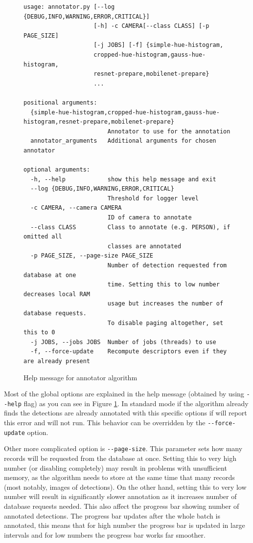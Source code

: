 \begin{figure}
    \begin{verbatim}
usage: annotator.py [--log {DEBUG,INFO,WARNING,ERROR,CRITICAL}]
                    [-h] -c CAMERA[--class CLASS] [-p PAGE_SIZE]
                    [-j JOBS] [-f] {simple-hue-histogram,
                    cropped-hue-histogram,gauss-hue-histogram,
                    resnet-prepare,mobilenet-prepare}
                    ...

positional arguments:
  {simple-hue-histogram,cropped-hue-histogram,gauss-hue-histogram,resnet-prepare,mobilenet-prepare}
                        Annotator to use for the annotation
  annotator_arguments   Additional arguments for chosen annotator

optional arguments:
  -h, --help            show this help message and exit
  --log {DEBUG,INFO,WARNING,ERROR,CRITICAL}
                        Threshold for logger level
  -c CAMERA, --camera CAMERA
                        ID of camera to annotate
  --class CLASS         Class to annotate (e.g. PERSON), if omitted all
                        classes are annotated
  -p PAGE_SIZE, --page-size PAGE_SIZE
                        Number of detection requested from database at one
                        time. Setting this to low number decreases local RAM
                        usage but increases the number of database requests.
                        To disable paging altogether, set this to 0
  -j JOBS, --jobs JOBS  Number of jobs (threads) to use
  -f, --force-update    Recompute descriptors even if they are already present
    \end{verbatim}
    \caption{Help message for annotator algorithm}
    \label{fig:annotator_help}
\end{figure}

Most of the global options are explained in the help message (obtained by using
\verb+--help+ flag) as you can see in Figure \ref{fig:annotator_help}. In standard
mode if the algorithm already finds the detections are already annotated with this
specific options if will report this error and will not run. This behavior can be
overridden by the \verb+--force-update+ option.

Other more complicated option is \verb+--page-size+. This parameter sets how many
records will be requested from the database at once. Setting this to very high number
(or disabling completely) may result in problems with unsufficient memory, as the 
algorithm needs to store at the same time that many records (most notably, images of 
detections). On the other hand, setting this to very low number will result in
significantly slower annotation as it increases number of database requests needed.
This also affect the progress bar showing number of annotated detections. The progress
bar updates after the whole batch is annotated, this means that for high number the
progress bar is updated in large intervals and for low numbers the progress bar works
far smoother.

